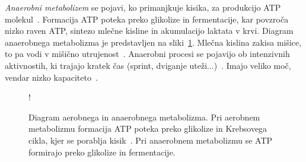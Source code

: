 \emph{Anaerobni metabolizem} se pojavi, ko primanjkuje kisika, za produkcijo ATP molekul~\cite{patel2017aerobic}. Formacija ATP poteka preko glikolize in fermentacije, kar povzroča nizko raven ATP, sintezo mlečne kisline in akumulacijo laktata v krvi. Diagram anaerobnega metabolizma je predstavljen na sliki~\ref{fig:metabolism}. Mlečna kislina zakisa mišice, to pa vodi v mišično utrujenost~\cite{sahlin1998energy}. Anaerobni procesi se pojavijo ob intenzivnih aktivnostih, ki trajajo kratek čas (sprint, dviganje uteži...)~\cite{patel2017aerobic}. Imajo  veliko moč, vendar nizko kapaciteto~\cite{sahlin1998energy}.


\begin{figure}[!htbp]
\centering
\resizebox {\columnwidth} {!}{

}
 \caption[Diagram aerobnega in anaerobnega metabolizma]{Diagram aerobnega in anaerobnega metabolizma. Pri aerobnem metabolizmu formacija ATP poteka preko glikolize in Krebsovega cikla, kjer se porablja kisik~\cite{scott2005misconceptions}. Pri anaerobnem metabolizmu se ATP formirajo preko glikolize in fermentacije.}
 \label{fig:metabolism}
\end{figure}
